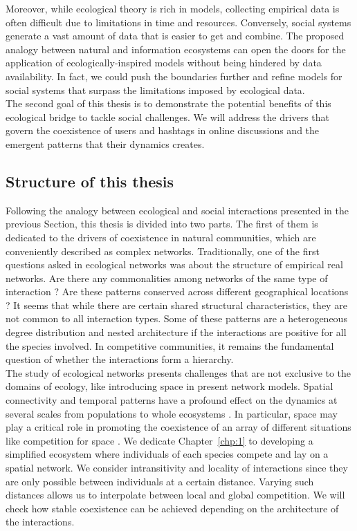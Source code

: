 Moreover, while ecological theory is rich in models, collecting empirical data is often difficult due to limitations in time and resources. Conversely, social systems generate a vast amount of data that is easier to get and combine. The proposed analogy between natural and information ecosystems can open the doors for the application of ecologically-inspired models without being hindered by data availability. In fact, we could push the boundaries further and refine models for social systems that surpass the limitations imposed by ecological data. \\

The second goal of this thesis is to demonstrate the potential benefits of this ecological bridge to tackle social challenges. We will address the drivers that govern the coexistence of users and hashtags in online discussions and the emergent patterns that their dynamics creates. \\

\subsection{Structure of this thesis}
Following the analogy between ecological and social interactions presented in the previous Section, this thesis is divided into two parts. The first of them is dedicated to the drivers of coexistence in natural communities, which are conveniently described as complex networks. Traditionally, one of the first questions asked in ecological networks was about the structure of empirical real networks. Are there any commonalities among networks of the same type of interaction \cite{Fontaine2011TheNetworks}? Are these patterns conserved across different geographical locations \cite{galiana2022ecological}? It seems that while there are certain shared structural characteristics, they are not common to all interaction types. Some of these patterns are a heterogeneous degree distribution \cite{jordano2003invariant} and nested architecture \cite{bascompte2003nested}  if the interactions are positive for all the species involved. In competitive communities, it remains the fundamental question of whether the interactions form a hierarchy. \\

The study of ecological networks presents challenges that are not exclusive to the domains of ecology, like introducing space in present network models. Spatial connectivity and temporal patterns have a profound effect on the dynamics at several scales from populations to whole ecosystems \cite{intro2020theoretical}. In particular, space may play a critical role in promoting the coexistence of an array of different situations like competition for space  \cite{maynard2017diversity,godoy2017intransitivity, Dieckmann2000}. We dedicate Chapter~\ref{chp:1} to developing a simplified ecosystem where individuals of each species compete and lay on a spatial network. We consider intransitivity and locality of interactions since they are only possible between individuals at a certain distance. Varying such distances allows us to interpolate between local and global competition. We will check how stable coexistence can be achieved depending on the architecture of the interactions. \\

